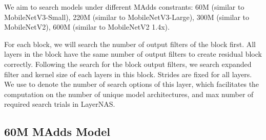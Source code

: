 
We aim to search models under different MAdds constrants: 60M (similar to MobileNetV3-Small), 220M (similar to MobileNetV3-Large), 300M (similar to MobileNetV2), 600M (similar to MobileNetV2 1.4x). 

For each block, we will search the number of output filters of the block first. All layers in the block have the same number of output filters to create residual block correctly. Following the search for the block output filters, we search expanded filter and kernel size of each layers in this block. Strides are fixed for all layers. We use  to denote the number of search options of this layer, which facilitates the computation on the number of unique model architectures, and max number of required search trials in LayerNAS.


\subsection{60M MAdds Model}



